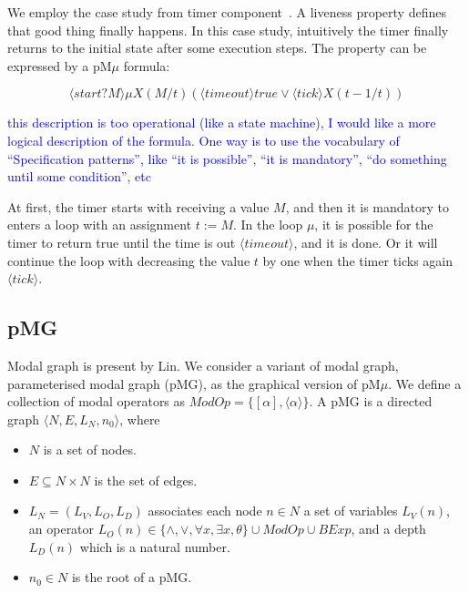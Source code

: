 \documentclass[runningheads,a4paper]{llncs}
\newcommand{\ERIC}[1]{\textcolor{blue}{#1}}
\begin{document}
We employ the case study from timer component~\cite{mavridou2016architectrue}. A liveness property defines that good thing finally happens. In this case study, intuitively the timer finally returns to the initial state after some execution steps. The property can be expressed by a pM$\mu$ formula:

\begin{equation}\label{formula1}
	\langle start?M\rangle\mu X(M/t)(\langle timeout\rangle true \vee \langle tick\rangle X(t-1/t))
\end{equation}


\ERIC{this description is too operational (like a state machine), I would like a more logical description of the formula. One way is to use the vocabulary of ``Specification patterns'', like ``it is possible'', ``it is mandatory'', ``do something until some condition'', etc}

At first, the timer starts with receiving a value $M$, and then it is mandatory to enters a loop with an assignment $t := M$.  In the loop $\mu$, it is possible for the timer to return true until the time is out $\langle timeout\rangle$, and it is done. Or it will continue the loop with decreasing the value $t$ by one when the timer ticks again $\langle tick\rangle$.




\subsection{pMG}

Modal graph is present by Lin\cite{lin2001modal}. We consider a variant of modal graph, parameterised modal graph (pMG), as the graphical version of pM$\mu$. We define a collection of modal operators as $ModOp = \{[\alpha], \langle\alpha\rangle\}$. A pMG is a directed graph $\langle N, E, L_{N}, n_{0}\rangle$, where
\begin{itemize}
	\item $N$ is a set of nodes.
	\item $E \subseteq N\times N$ is the set of edges.
	\item $L_{N} = (L_{V}, L_{O}, L_{D})$ associates each node $n\in N$ a set of variables $L_{V}(n)$, an operator $L_{O}(n)\in\{\wedge, \vee, \forall x, \exists x, \theta\}\cup ModOp \cup BExp$, and a depth $L_{D}(n)$ which is a natural number.
	\item $n_{0} \in N$ is the root of a pMG.
\end{itemize}
\end{document}
